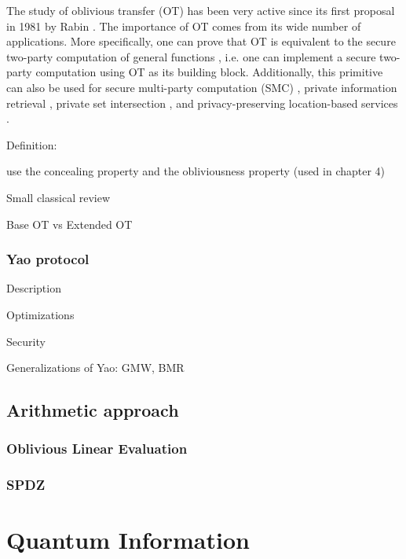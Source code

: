 The study of oblivious transfer (OT) has been very active since its first proposal in 1981 by Rabin \cite{Rabin81}. The importance of OT comes from its wide number of applications. More specifically, one can prove that OT is equivalent to the secure two-party computation of general functions \cite{Y86, K88}, i.e. one can implement a secure two-party computation using OT as its building block. Additionally, this primitive can also be used for secure multi-party computation (SMC) \cite{KOS16}, private information retrieval \cite{Che04}, private set intersection \cite{MEP17}, and privacy-preserving location-based services \cite{BHM+19}. 









Definition:

use the concealing property and the obliviousness property (used in chapter 4)

Small classical review 

Base OT vs Extended OT

\subsubsection{Yao protocol}\label{yaoProtocol}

Description

Optimizations

Security

Generalizations of Yao: GMW, BMR

\subsection{Arithmetic approach}

\subsubsection{Oblivious Linear Evaluation}

\subsubsection{SPDZ}





\section{Quantum Information}

